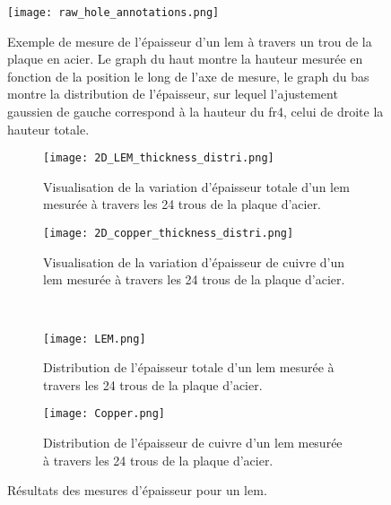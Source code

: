                 \begin{figure}[htpb]
                    \texttt{[image: raw\_hole\_annotations.png]}
                    \caption[Exemple de mesure de l'épaisseur d'un \gls{lem} mesurée à travers un trou de la plaque en acier.]{Exemple de mesure de l'épaisseur d'un \gls{lem} à travers un trou de la plaque en acier. Le graph du haut montre la hauteur mesurée en fonction de la position le long de l'axe de mesure, le graph du bas montre la distribution de l'épaisseur, sur lequel l'ajustement gaussien de gauche correspond à la hauteur du \gls{fr4}, celui de droite la hauteur totale.}
                    \label{fig::distri_1_trou_lem}
                \end{figure}
                    
                \begin{figure}[htpb]
                    \begin{subfigure}[t]{0.48\textwidth}
                        \texttt{[image: 2D\_LEM\_thickness\_distri.png]}
                        \caption{Visualisation de la variation d'épaisseur totale d'un \gls{lem} mesurée à travers les 24 trous de la plaque d'acier.}
                        \label{fig::distri_24_trou_lem_2D}
                    \end{subfigure}
                    \hfill
                    \begin{subfigure}[t]{0.48\textwidth}
                        \texttt{[image: 2D\_copper\_thickness\_distri.png]}
                        \caption{Visualisation de la variation d'épaisseur de cuivre d'un \gls{lem} mesurée à travers les 24 trous de la plaque d'acier.}
                        \label{fig::distri_24_trou_cuivre_2D}
                    \end{subfigure}\\
                    \begin{subfigure}[b]{0.48\textwidth}
                        \texttt{[image: LEM.png]}
                        \caption{Distribution de l'épaisseur totale d'un \gls{lem} mesurée à travers les 24 trous de la plaque d'acier.}
                        \label{fig::distri_24_trou_lem_1D}
                    \end{subfigure}
                    \hfill
                    \begin{subfigure}[b]{0.48\textwidth}
                        \texttt{[image: Copper.png]}
                        \caption{Distribution de l'épaisseur de cuivre d'un \gls{lem} mesurée à travers les 24 trous de la plaque d'acier.}
                        \label{fig::distri_24_trou_cuivre_1D}
                    \end{subfigure}
                    \caption[Résultats des mesures d'épaisseur pour un \gls{lem}.]{Résultats des mesures d'épaisseur pour un \gls{lem}.}
                    \label{fig::distri_epaisseur_1_lem}
                \end{figure}
                
